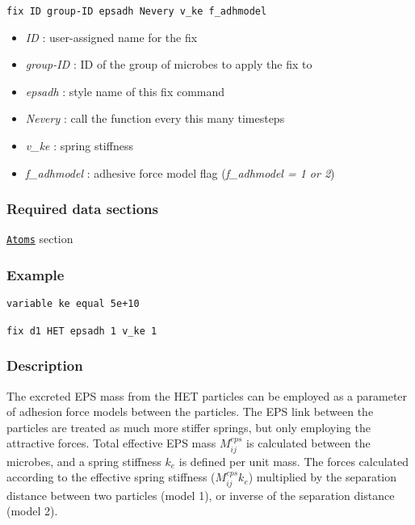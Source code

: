 \documentclass[11pt,a4paper,openright]{article}
\begin{document}
\begin{Verbatim}[frame=single]
fix ID group-ID epsadh Nevery v_ke f_adhmodel
\end{Verbatim}

\begin{itemize}  [nosep]
\item
	{\it ID }: user-assigned name for the fix
\item
	{\it group-ID }: ID of the group of microbes to apply the fix to
\item
	{\it epsadh }: style name of this fix command
\item
	{\it Nevery }: call the function every this many timesteps
\item
	{\it v\_ke }: spring stiffness
\item
	{\it f\_adhmodel }: adhesive force model flag ({\it f\_adhmodel = 1 or 2})

\end{itemize}

\subsubsection*{Required data sections} 
\hyperref[satom]{\tt Atoms} section


\subsubsection*{Example}

\begin{Verbatim}[frame=single]
variable ke equal 5e+10

fix d1 HET epsadh 1 v_ke 1
\end{Verbatim}

\subsubsection*{Description}

The excreted EPS mass from the HET particles can be employed as a parameter of adhesion force models between the particles. The EPS link between the particles are treated as much more stiffer springs, but only employing the attractive forces. Total effective EPS mass $M^{eps}_{ij}$ is calculated between the microbes, and a spring stiffness $k_{e}$ is defined per unit mass. The forces calculated according to the effective spring stiffness ($M^{eps}_{ij} k_{e}$) multiplied by the separation distance between two particles (model 1), or inverse of the separation distance (model 2). 
\end{document}
